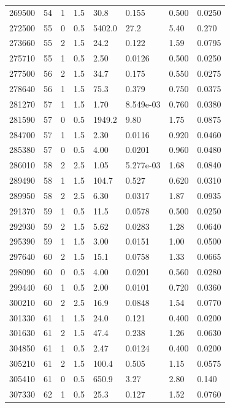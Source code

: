 \documentclass[preview]{standalone}
\begin{document}
{{{{{\begin{tabular}{L{1.2cm}C{1.2cm} C{0.3cm}C{0.5cm} C{1.4cm}C{1.4cm} C{1.4cm}C{1.4cm}}
  269500  &    54  & 1     & 1.5 &  30.8  & 0.155  & 0.500 &  0.0250   \\ 
  272500  &    55  & 0     & 0.5 &  5402.0  & 27.2  & 5.40 &  0.270   \\ 
  273660  &    55  & 2     & 1.5 &  24.2  & 0.122  & 1.59 &  0.0795   \\ 
  275710  &    55  & 1     & 0.5 &  2.50  & 0.0126  & 0.500 &  0.0250   \\ 
  277500  &    56  & 2     & 1.5 &  34.7  & 0.175  & 0.550 &  0.0275   \\ 
  278640  &    56  & 1     & 1.5 &  75.3  & 0.379  & 0.750 &  0.0375   \\ 
  281270  &    57  & 1     & 1.5 &  1.70  & 8.549e-03  & 0.760 &  0.0380   \\ 
  281590  &    57  & 0     & 0.5 &  1949.2  & 9.80  & 1.75 &  0.0875   \\ 
  284700  &    57  & 1     & 1.5 &  2.30  & 0.0116  & 0.920 &  0.0460   \\ 
  285380  &    57  & 0     & 0.5 &  4.00  & 0.0201  & 0.960 &  0.0480   \\ 
  286010  &    58  & 2     & 2.5 &  1.05  & 5.277e-03  & 1.68 &  0.0840   \\ 
  289490  &    58  & 1     & 1.5 &  104.7  & 0.527  & 0.620 &  0.0310   \\ 
  289950  &    58  & 2     & 2.5 &  6.30  & 0.0317  & 1.87 &  0.0935   \\ 
  291370  &    59  & 1     & 0.5 &  11.5  & 0.0578  & 0.500 &  0.0250   \\ 
  292930  &    59  & 2     & 1.5 &  5.62  & 0.0283  & 1.28 &  0.0640   \\ 
  295390  &    59  & 1     & 1.5 &  3.00  & 0.0151  & 1.00 &  0.0500   \\ 
  297640  &    60  & 2     & 1.5 &  15.1  & 0.0758  & 1.33 &  0.0665   \\ 
  298090  &    60  & 0     & 0.5 &  4.00  & 0.0201  & 0.560 &  0.0280   \\ 
  299440  &    60  & 1     & 0.5 &  2.00  & 0.0101  & 0.720 &  0.0360   \\ 
  300210  &    60  & 2     & 2.5 &  16.9  & 0.0848  & 1.54 &  0.0770   \\ 
  301330  &    61  & 1     & 1.5 &  24.0  & 0.121  & 0.400 &  0.0200   \\ 
  301630  &    61  & 2     & 1.5 &  47.4  & 0.238  & 1.26 &  0.0630   \\ 
  304850  &    61  & 1     & 0.5 &  2.47  & 0.0124  & 0.400 &  0.0200   \\ 
  305210  &    61  & 2     & 1.5 &  100.4  & 0.505  & 1.15 &  0.0575   \\ 
  305410  &    61  & 0     & 0.5 &  650.9  & 3.27  & 2.80 &  0.140   \\ 
  307330  &    62  & 1     & 0.5 &  25.3  & 0.127  & 1.52 &  0.0760   \\ 
\hline 
\end{tabular} 

}}}}}
\end{document}
